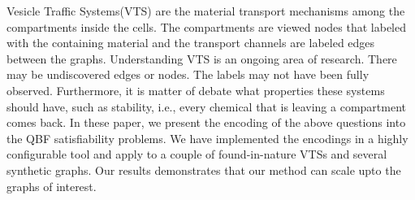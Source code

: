 Vesicle Traffic Systems(VTS) are the material transport mechanisms
among the compartments inside the cells.
%
The compartments are viewed nodes that labeled with the containing
material and the transport channels are labeled edges between the
graphs.
%
Understanding VTS is an ongoing area of research.
%
There may be undiscovered edges or nodes.
%
The labels may not have been fully observed.
%
Furthermore, it is matter of debate what properties
these systems should have, such as stability, i.e., every
chemical that is leaving a compartment comes back. 
%
In these paper, we present the encoding of the above questions
into the QBF satisfiability problems.
%
We have implemented the encodings in a highly configurable tool
and  apply to a couple of found-in-nature VTSs and 
several synthetic graphs.
%
Our results demonstrates that our method can scale upto the
graphs of interest.
%


